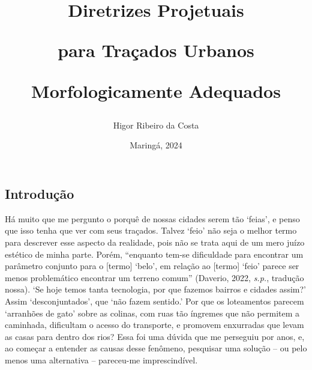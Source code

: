 \documentclass[12pt, a4paper]{book} %
\begin{document}
\frontmatter %

\title{Diretrizes Projetuais 

para Traçados Urbanos

Morfologicamente Adequados}

\author{Higor Ribeiro da Costa}
\date{Maringá, 2024}

    \maketitle

    \tableofcontents
    \listoffigures %
    \listoftables %


    \mainmatter %

    \onehalfspacing
    

    \part*{}

        \chapter*{Introdução}
        
        Há muito que me pergunto o porquê de nossas cidades serem tão `feias', e penso que isso tenha que ver com seus traçados. Talvez `feio' não seja o melhor termo para descrever esse aspecto da realidade, pois não se trata aqui de um mero juízo estético de minha parte. Porém, ``enquanto tem-se dificuldade para encontrar um parâmetro conjunto para o [termo] `belo', em relação ao [termo] `feio' parece ser menos problemático encontrar um terreno comum'' (Daverio, 2022, \textit{s.p.}, tradução nossa). `Se hoje temos tanta tecnologia, por que fazemos bairros e cidades assim?' Assim `desconjuntados', que `não fazem sentido.' Por que os loteamentos parecem `arranhões de gato' sobre as colinas, com ruas tão íngremes que não permitem a caminhada, dificultam o acesso do transporte, e promovem enxurradas que levam as casas para dentro dos rios? Essa foi uma dúvida que me perseguiu por anos, e, ao começar a entender as causas desse fenômeno, pesquisar uma solução – ou pelo menos uma alternativa – pareceu-me imprescindível.

\end{document}
